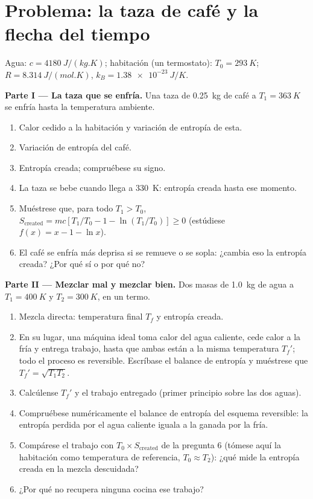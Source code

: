 \section{Problema: la taza de café y la flecha del tiempo}

\begin{problem}
\label{pb:b1:second-law-entropy:1}
Agua: $c = \qty{4180}{J/(kg.K)}$; habitación (un termostato): $T_0 = \qty{293}{K}$;
$R = \qty{8.314}{J/(mol.K)}$, $k_B = \qty{1.38e-23}{J/K}$.

\medskip
\noindent\textbf{Parte I --- La taza que se enfría.}
Una taza de \qty{0.25}{kg} de café a $T_1 = \qty{363}{K}$ se enfría hasta la
temperatura ambiente.
\begin{enumerate}
  \item Calor cedido a la habitación y variación de entropía de esta.
  \item Variación de entropía del café.
  \item Entropía creada; compruébese su signo.
  \item La taza se bebe cuando llega a \qty{330}{K}: entropía creada hasta
        ese momento.
  \item Muéstrese que, para todo $T_1 > T_0$, $S_{\mathrm{created}} = mc[T_1/T_0 - 1 -
        \ln(T_1/T_0)] \geq 0$ (estúdiese $f(x) = x - 1 - \ln x$).
  \item El café se enfría más deprisa si se remueve o se sopla: ¿cambia eso
        la entropía creada? ¿Por qué sí o por qué no?
\end{enumerate}

\medskip
\noindent\textbf{Parte II --- Mezclar mal y mezclar bien.}
Dos masas de \qty{1.0}{kg} de agua a $T_1 = \qty{400}{K}$ y $T_2 =
\qty{300}{K}$, en un termo.
\begin{enumerate}[resume]
  \item Mezcla directa: temperatura final $T_f$ y entropía creada.
  \item En su lugar, una máquina ideal toma calor del agua caliente, cede
        calor a la fría y entrega trabajo, hasta que ambas están a la misma
        temperatura $T_f'$; todo el proceso es reversible. Escríbase el
        balance de entropía y muéstrese que $T_f' = \sqrt{T_1T_2}$.
  \item Calcúlense $T_f'$ y el trabajo entregado (primer principio sobre
        las dos aguas).
  \item Compruébese numéricamente el balance de entropía del esquema
        reversible: la entropía perdida por el agua caliente iguala a la
        ganada por la fría.
  \item Compárese el trabajo con $T_0 \times S_{\mathrm{created}}$ de la
        pregunta 6 (tómese aquí la habitación como temperatura de
        referencia, $T_0 \approx T_2$): ¿qué mide la entropía creada en la
        mezcla descuidada?
  \item ¿Por qué no recupera ninguna cocina ese trabajo?
\end{enumerate}


\end{problem}

